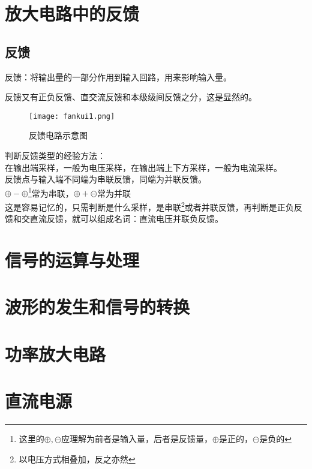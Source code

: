 \documentclass[cn,pad,11pt,geye]{elegantnote}
\begin{document}
\section{放大电路中的反馈}
\subsection{反馈}
\begin{definition}
	反馈：将输出量的一部分作用到输入回路，用来影响输入量。
\end{definition}
\begin{note}
	反馈又有正负反馈、直交流反馈和本级级间反馈之分，这是显然的。
\end{note}
\begin{figure}[h]
	\centering
	\texttt{[image: fankui1.png]}
	\caption{反馈电路示意图}
\end{figure}
\begin{note}
	判断反馈类型的经验方法：\\
	在输出端采样，一般为电压采样，在输出端上下方采样，一般为电流采样。\\
	反馈点与输入端不同端为串联反馈，同端为并联反馈。\\
	$\oplus-\oplus$\footnote{这里的$\oplus,\circleddash$应理解为前者是输入量，后者是反馈量，$\oplus$是正的，$\circleddash$是负的}常为串联，$\oplus+\circleddash$常为并联\\
	这是容易记忆的，只需判断是什么采样，是串联\footnote{以电压方式相叠加，反之亦然}或者并联反馈，再判断是正负反馈和交直流反馈，就可以组成名词：直流电压并联负反馈。
\end{note}

\section{信号的运算与处理}
\section{波形的发生和信号的转换}
\section{功率放大电路}
\section{直流电源}
\end{document}

